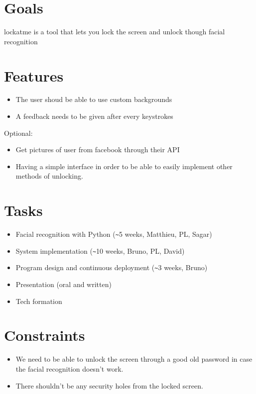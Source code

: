 \documentclass{article}
\begin{document}
\section{Goals}
  lockatme is a tool that lets you lock the screen and unlock though facial
  recognition

\section{Features}
  \begin{itemize}
    \item The user shoud be able to use custom backgrounds
    \item A feedback needs to be given after every keystrokes
  \end{itemize}
  Optional:
  \begin{itemize}
    \item Get pictures of user from facebook through their API
    \item Having a simple interface in order to be able to easily implement
    other methods of unlocking.
  \end{itemize}

\section{Tasks}
  \begin{itemize}
    \item Facial recognition with Python (\verb+~+5 weeks, Matthieu, PL, Sagar)
    \item System implementation (\verb+~+10 weeks, Bruno, PL, David)
    \item Program design and continuous deployment (\verb+~+3 weeks, Bruno)
    \item Presentation (oral and written)
    \item Tech formation
  \end{itemize}

\section{Constraints}
  \begin{itemize}
    \item We need to be able to unlock the screen through a good old password
    in case the facial recognition doesn't work.
   \item There shouldn't be any security holes from the locked screen.
  \end{itemize}
\end{document}
